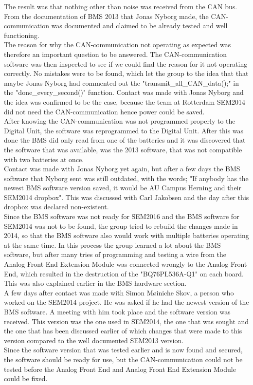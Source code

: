 The result was that nothing other than noise was received from the CAN bus.
From the documentation of BMS 2013 \cite{BMSDocumentation} that Jonas Nyborg made, the CAN-communication was documented and claimed to be already tested and well functioning.\\
The reason for why the CAN-communication not operating as expected was therefore an important question to be answered. The CAN-communication software was then inspected to see if we could find the reason for it not operating correctly. No mistakes were to be found, which let the group to the idea that that maybe Jonas Nyborg had commented out the "transmit\_all\_CAN\_data();" in the "done\_every\_second()" function. Contact was made with Jonas Nyborg and the idea was confirmed to be the case, because the team at Rotterdam SEM2014 did not need the CAN-communication hence power could be saved.\\
After knowing the CAN-communication was not programmed properly to the Digital Unit, the software was reprogrammed to the Digital Unit. After this was done the BMS did only read from one of the batteries and it was discovered that the software that was available, was the 2013 software, that was not compatible with two batteries at once.\\
Contact was made with Jonas Nyborg yet again, but after a few days the BMS software that Nyborg sent was still outdated, with the words; "If anybody has the newest BMS software version saved, it would be AU Campus Herning and their SEM2014 dropbox". This was discussed with Carl Jakobsen and the day after this dropbox was declared non-existent.\\
Since the BMS software was not ready for SEM2016 and the BMS software for SEM2014 was not to be found, the group tried to rebuild the changes made in 2014, so that the BMS software also would work with multiple batteries operating at the same time. In this process the group learned a lot about the BMS software, but after many tries of programming and testing a wire from the Analog Front End Extension Module was connected wrongly to the Analog Front End, which resulted in the destruction of the "BQ76PL536A-Q1" \cite{BMSBattIC} on each board. This was also explained earlier in the BMS hardware section.\\
A few days after contact was made with Simon Møiniche Skov, a person who worked on the SEM2014 project. He was asked if he had the newest version of the BMS software. A meeting with him took place and the software version was received. This version was the one used in SEM2014, the one that was sought and the one that has been discussed earlier of which changes that were made to this version compared to the well documented SEM2013 version.\\
Since the software version that was tested earlier and is now found and secured, the software should be ready for use, but the CAN-communication could not be tested before the Analog Front End and Analog Front End Extension Module could be fixed. 